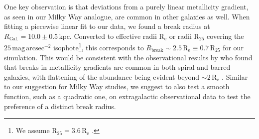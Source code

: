\documentclass[twocolumn,apj,numberedappendix,appendixfloats,twocolappendix]{openjournal}
\begin{document}
\begin{CJK*}{UTF8}{gbsn}
One key observation is that deviations from a purely linear metallicity gradient, as seen in our Milky Way analogue, are common in other galaxies as well. When fitting a piecewise linear fit to our data, we found a break radius at $R_\mathrm{Gal.} = 10.0 \pm 0.5\,\mathrm{kpc}$. Converted to effective radii $\mathrm{R_e}$ or radii $\mathrm{R_{25}}$ covering the $25\,\mathrm{mag\,arcsec^{-2}}$ isophote\footnote{We assume $\mathrm{R_{25}} = 3.6\,\mathrm{R_e}$ \citep{Williams2009, Chen2023}.}, this corresponds to $R_\mathrm{break} \sim 2.5\,\mathrm{R_e} \equiv 0.7\,\mathrm{R_{25}}$ for our simulation. This would be consistent with the observational results by \citet{Sanchez2014} who found that breaks in metallicity gradients are common in both spiral and barred galaxies, with flattening of the abundance being evident beyond $\sim 2\,\mathrm{R_e}$ \citep[compare also to][]{Belfiore2017}. Similar to our suggestion for Milky Way studies, we suggest to also test a smooth function, such as a quadratic one, on extragalactic observational data \citep[e.g.][]{Bresolin2012, Chen2023} to test the preference of a distinct break radius.


\end{CJK*}
\end{document}
